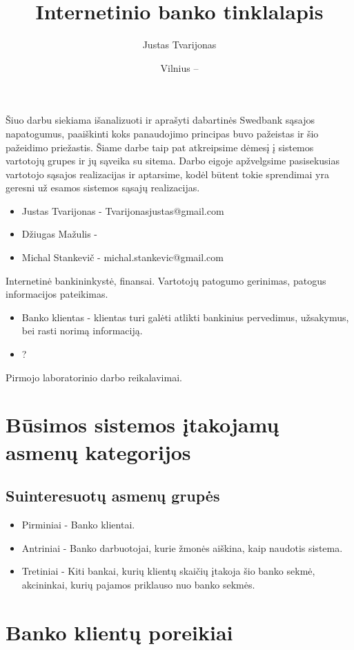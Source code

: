 \documentclass{VUMIFPSkursinis}
\title{Internetinio banko tinklalapis}
\author{Justas Tvarijonas}
\date{Vilnius – \the\year}
\begin{document}
\maketitle

\tableofcontents
{}
Šiuo darbu siekiama išanalizuoti ir aprašyti dabartinės Swedbank sąsajos napatogumus, paaiškinti koks panaudojimo principas buvo pažeistas ir šio pažeidimo priežastis.
Šiame darbe taip pat atkreipsime dėmesį į sistemos vartotojų grupes ir jų sąveika su sitema.
Darbo eigoje apžvelgsime pasisekusias vartotojo sąsajos realizacijas ir aptarsime, kodėl būtent tokie sprendimai yra geresni už esamos sistemos sąsajų realizacijas.
\begin{itemize}
	\item Justas Tvarijonas - Tvarijonasjustas@gmail.com
	\item Džiugas Mažulis -
	\item Michal Stankevič - michal.stankevic@gmail.com
\end{itemize}
Internetinė bankininkystė, finansai.
Vartotojų patogumo gerinimas, patogus informacijos pateikimas.
\begin{itemize}
	\item Banko klientas - klientas turi galėti atlikti bankinius pervedimus, užsakymus, bei rasti norimą informaciją.
	\item ?
\end{itemize}
Pirmojo laboratorinio darbo reikalavimai.
\section{Būsimos sistemos įtakojamų asmenų kategorijos}
\subsection{Suinteresuotų asmenų grupės}
\begin{itemize}
	\item Pirminiai - Banko klientai.
	\item Antriniai - Banko darbuotojai, kurie žmonės aiškina, kaip naudotis sistema.
	\item Tretiniai - Kiti bankai, kurių klientų skaičių įtakoja šio banko sekmė, akcininkai, kurių pajamos priklauso nuo banko sekmės.
\end{itemize}
\section{Banko klientų poreikiai}
\end{document}
